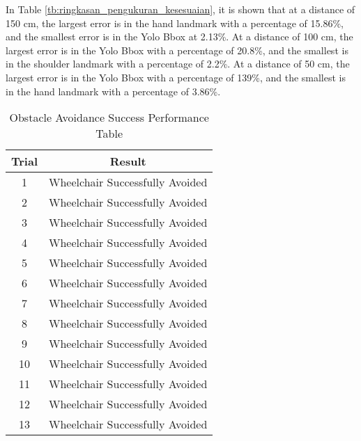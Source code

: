 In Table \ref{tb:ringkasan_pengukuran_kesesuaian}, it is shown that at a distance of 150 cm, the largest error is in the hand landmark with a percentage of 15.86\%, and the smallest error is in the Yolo Bbox at 2.13\%. At a distance of 100 cm, the largest error is in the Yolo Bbox with a percentage of 20.8\%, and the smallest is in the shoulder landmark with a percentage of 2.2\%. At a distance of 50 cm, the largest error is in the Yolo Bbox with a percentage of 139\%, and the smallest is in the hand landmark with a percentage of 3.86\%.
\begin{table}[H]
    \centering
    \caption{Obstacle Avoidance Success Performance Table}
    \label{tb:Agungganteng}
    \begin{tabular}{|c|c|}
    \hline
    Trial & Result                                                               \\ \hline
    1         & \cellcolor[HTML]{9AFF99}Wheelchair Successfully Avoided              \\ \hline
    2         & \cellcolor[HTML]{9AFF99}Wheelchair Successfully Avoided              \\ \hline
    3         & \cellcolor[HTML]{9AFF99}Wheelchair Successfully Avoided              \\ \hline
    4         & \cellcolor[HTML]{9AFF99}Wheelchair Successfully Avoided              \\ \hline
    5         & \cellcolor[HTML]{9AFF99}Wheelchair Successfully Avoided              \\ \hline
    6         & \cellcolor[HTML]{9AFF99}Wheelchair Successfully Avoided              \\ \hline
    7         & \cellcolor[HTML]{9AFF99}Wheelchair Successfully Avoided              \\ \hline
    8         & \cellcolor[HTML]{9AFF99}Wheelchair Successfully Avoided              \\ \hline
    9         & \cellcolor[HTML]{9AFF99}Wheelchair Successfully Avoided              \\ \hline
    10        & \cellcolor[HTML]{9AFF99}Wheelchair Successfully Avoided              \\ \hline
    11        & \cellcolor[HTML]{9AFF99}Wheelchair Successfully Avoided              \\ \hline
    12        & \cellcolor[HTML]{9AFF99}Wheelchair Successfully Avoided              \\ \hline
    13        & \cellcolor[HTML]{9AFF99}Wheelchair Successfully Avoided              \\ \hline

\end{tabular}
\end{table}
